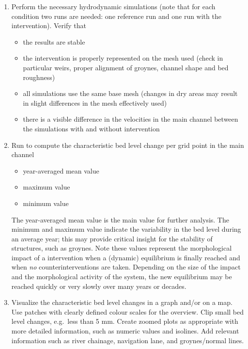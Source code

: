 \begin{enumerate}
\item Perform the necessary hydrodynamic simulations (note that for each condition two runs are needed: one reference run and one run with the intervention).
Verify that
\begin{itemize}
\item the \dflowfm results are stable
\item the intervention is properly represented on the mesh used (check in particular weirs, proper alignment of groynes, channel shape and bed roughness)
\item all simulations use the same base mesh (changes in dry areas may result in slight differences in the mesh effectively used)
\item there is a visible difference in the velocities in the main channel between the simulations with and without intervention
\end{itemize}

\item Run \dfastmi to compute the characteristic bed level change per grid point in the main channel

\begin{itemize}
\item year-averaged mean value 
\item maximum value 
\item minimum value 
\end{itemize}

The year-averaged mean value is the main value for further analysis.
The minimum and maximum value indicate the variability in the bed level during an average year; this may provide critical insight for the stability of structures, such as groynes.
Note these values represent the morphological impact of a intervention when a (dynamic) equilibrium is finally reached and when \emph{no} counterinterventions are taken.
Depending on the size of the impact and the morphological activity of the system, the new equilibrium may be reached quickly or very slowly over many years or decades.

\item Visualize the characteristic bed level changes in a graph and/or on a map.
Use patches with clearly defined colour scales for the overview.
Clip small bed level changes, e.g.~less than 5 mm.
Create zoomed plots as appropriate with more detailed information, such as numeric values and isolines.
Add relevant information such as river chainage, navigation lane, and groynes/normal lines.


\end{enumerate}
